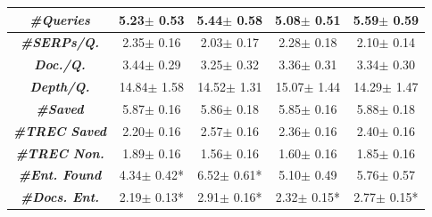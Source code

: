 \begin{table}
\begin{tabulary}{\textwidth}{|c||c|c|c|c|}
        \hline
        \hline
 \textbf{\emph{\#Queries}} & 5.23$\pm$ 0.53 & 5.44$\pm$ 0.58 & 5.08$\pm$ 0.51 & 5.59$\pm$ 0.59 \\ \hline
 \textbf{\emph{\#SERPs/Q.}} & 2.35$\pm$ 0.16 & 2.03$\pm$ 0.17 & 2.28$\pm$ 0.18 & 2.10$\pm$ 0.14 \\ \hline
 \textbf{\emph{Doc./Q.}} & 3.44$\pm$ 0.29 & 3.25$\pm$ 0.32 & 3.36$\pm$ 0.31 & 3.34$\pm$ 0.30 \\ \hline
 \textbf{\emph{Depth/Q.}} & 14.84$\pm$ 1.58 & 14.52$\pm$ 1.31 & 15.07$\pm$ 1.44 & 14.29$\pm$ 1.47 \\ \hline
 \textbf{\emph{\#Saved}} & 5.87$\pm$ 0.16 & 5.86$\pm$ 0.18 & 5.85$\pm$ 0.16 & 5.88$\pm$ 0.18 \\ \hline
 \textbf{\emph{\#TREC Saved}}  & 2.20$\pm$ 0.16 & 2.57$\pm$ 0.16 & 2.36$\pm$ 0.16 & 2.40$\pm$ 0.16 \\ \hline
    \textbf{\emph{\#TREC Non.}}  & 1.89$\pm$ 0.16 & 1.56$\pm$ 0.16 & 1.60$\pm$ 0.16 & 1.85$\pm$ 0.16 \\ \hline
    \textbf{\emph{\#Ent. Found}}  & 4.34$\pm$ 0.42* & 6.52$\pm$ 0.61* & 5.10$\pm$ 0.49 & 5.76$\pm$ 0.57 \\ \hline
    \textbf{\emph{\#Docs. Ent.}} & 2.19$\pm$ 0.13* & 2.91$\pm$ 0.16* & 2.32$\pm$ 0.15* & 2.77$\pm$ 0.15* \\ \hline     

    \end{tabulary}
\end{table}


